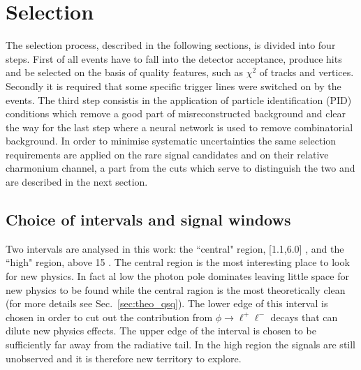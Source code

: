 \chapter{Selection}
\label{sec:RKst_selection}

The selection process, described in the following sections, is divided into four steps. 
First of all events have to fall into the detector acceptance, produce hits and be selected
on the basis of quality features, such as $\chi^2$ of tracks and vertices.
Secondly it is required that some specific trigger lines were switched on by the events.
The third step consistis in the application of particle identification (PID) conditions which remove a good
part of misreconstructed background and clear the way for the last step where a neural network is used
to remove combinatorial background.
In order to minimise systematic uncertainties the same selection requirements are applied on the rare signal
candidates and on their relative charmonium channel, a part from the \qsq cuts which serve to 
distinguish the two and are described in the next section.

\section{Choice of \qsq intervals and signal windows}
\label{sec:RKst_q2_choice}

Two \qsq intervals are analysed in this work: the ``central" \qsq region, [1.1,6.0] \gevgevcccc,
and the ``high" \qsq region, above 15 \gevgevcccc. The central \qsq region is the most interesting
place to look for new physics. In fact al low \qsq the photon pole dominates leaving little
space for new physics to be found while the central ragion is the most theoretically clean
(for more details see Sec.~\ref{sec:theo_qsq}). The lower edge of this interval is chosen in order
to cut out the contribution from $\phi\to\ell^+\ell^-$ decays that can dilute new physics effects.
The upper edge of the interval is chosen to be sufficiently far away from the \jpsi radiative tail.
In the high \qsq region the signals are still unobserved and it is therefore new territory to explore.

